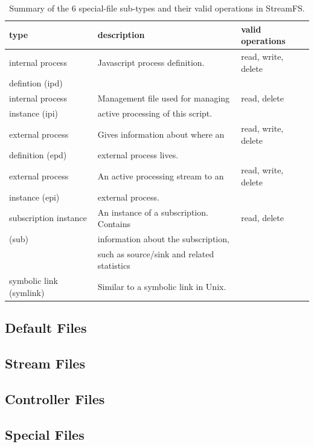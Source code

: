 \begin{table}[h]
\begin{center}
\begin{tabular}{| l | l | l |}
	\hline
	\textbf{type} & \textbf{description} & \textbf{valid operations} \\ \hline
	
	internal process  & Javascript process definition.  & read, write, delete  \\ 
	defintion (ipd)   & 							    &	\\ \hline

	internal process  & Management file used for managing & read, delete \\
	instance (ipi)	  & active processing of this script. & \\ \hline

	external process  & Gives information about where an & read, write, delete \\
	definition (epd)  & external process lives. &\\ \hline

	external process  & An active processing stream to an  & read, write, delete \\
	instance (epi)	  & external process. &\\ \hline

	subscription instance & An instance of a subscription.  Contains & read, delete \\
				(sub) 	  & information about the subscription, &\\
								& such as source/sink and related statistics &\\ \hline
								
	symbolic link (symlink) & Similar to a symbolic link in Unix. & \\
	\hline
\end{tabular}
\caption{Summary of the 6 special-file sub-types and their valid operations in StreamFS.}
\label{tab:filesubtypes}
\end{center}
\end{table}





\subsection{Default Files}

\subsection{Stream Files}

\subsection{Controller Files}

\subsection{Special Files}









